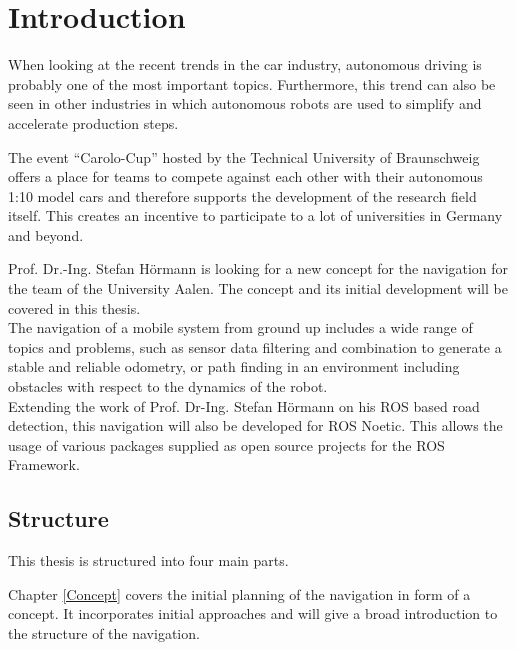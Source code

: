 \chapter{Introduction}
\label{introduction}

When looking at the recent trends in the car industry, autonomous driving is probably one of the most important topics. Furthermore, this trend can also be seen in other industries  in which autonomous robots are used to simplify and accelerate production steps. 



The event ``Carolo-Cup'' hosted by the Technical University of Braunschweig offers a place for teams to compete against each other with their autonomous 1:10 model cars and therefore supports the development of the research field itself. This creates an incentive to participate to a lot of universities in Germany and beyond.\\

Prof. Dr.-Ing. Stefan Hörmann is looking for a new concept for the navigation for the team of the University Aalen. The concept and its initial development will be covered in this thesis.\\
The navigation of a mobile system from ground up includes a wide range of topics and problems, such as sensor data filtering and combination to generate a stable and reliable odometry, or path finding in an environment including obstacles with respect to the dynamics of the robot.\\

Extending the work of Prof. Dr-Ing. Stefan Hörmann on his ROS based road detection, this navigation will also be developed for ROS Noetic. This allows the usage of various packages supplied as open source projects for the ROS Framework.

\section{Structure}

This thesis is structured into four main parts.

Chapter \ref{Concept} covers the initial planning of the navigation in form of a concept. It incorporates initial approaches and will give a broad introduction to the structure of the navigation.\\


